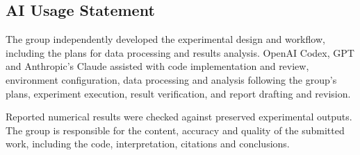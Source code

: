 \documentclass[10pt,a4paper,twocolumn,twoside]{rho-class/rho}
\begin{document}
\subsection{AI Usage Statement}
The group independently developed the experimental design and workflow, including the plans for data processing and results analysis. OpenAI Codex, GPT and Anthropic's Claude assisted with code implementation and review, environment configuration, data processing and analysis following the group's plans, experiment execution, result verification, and report drafting and revision.

Reported numerical results were checked against preserved experimental outputs. The group is responsible for the content, accuracy and quality of the submitted work, including the code, interpretation, citations and conclusions.


\printbibliography
\end{document}
